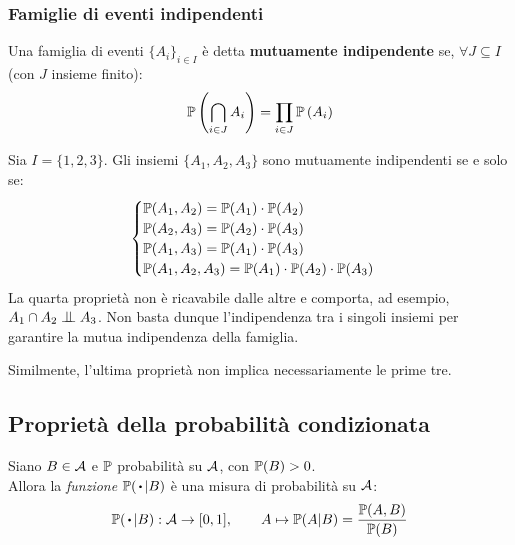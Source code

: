 
\subsubsection{Famiglie di eventi indipendenti}
\begin{defn}
  Una famiglia di eventi $\{A_i\}_{i \in I}$ è detta \textbf{mutuamente indipendente} se, $\forall J \subseteq I$ (con $J$ insieme finito):
  $$\mathbb P \left( \bigcap\limits_{i \in J} A_i \right) = \prod \limits_{i \in J} \mathbb P \left( A_i \right)$$
\end{defn}

\begin{ese}
  Sia $I = \{1, 2, 3\}$. Gli insiemi $\{A_1, A_2, A_3\}$ sono mutuamente indipendenti se e solo se:
  \begin{gather*}
  \begin{cases}
    \mathbb P (A_1, A_2) = \mathbb P (A_1) \cdot \mathbb P (A_2) \\
    \mathbb P (A_2, A_3) = \mathbb P (A_2) \cdot \mathbb P (A_3) \\
    \mathbb P (A_1, A_3) = \mathbb P (A_1) \cdot \mathbb P (A_3) \\
    \mathbb P (A_1, A_2, A_3) = \mathbb P (A_1) \cdot \mathbb P (A_2) \cdot \mathbb P (A_3)
  \end{cases}
  \end{gather*}
  La quarta proprietà non è ricavabile dalle altre e comporta, ad esempio, $A_1 \cap A_2 \indep A_3$.
  Non basta dunque l'indipendenza tra i singoli insiemi per garantire la mutua indipendenza della famiglia.
  
  Similmente, l'ultima proprietà non implica necessariamente le prime tre.
\end{ese}

\subsection{Proprietà della probabilità condizionata}

\begin{teob}[\JPTh{3.2}]
  Siano $B \in \mathcal A$ e $\mathbb P$ probabilità su $\mathcal A$, con $\mathbb P(B) > 0$. \\ Allora la \textit{funzione} $\PP(\, \bigcdot \, | B)$ è una misura di probabilità su $\mathcal A$:
   $$\PP(\, \bigcdot \, | B): \Ac \to [0, 1], \qquad A \mapsto \PP(A|B) = \frac{\PP(A,B)}{\PP(B)}$$
\end{teob}

